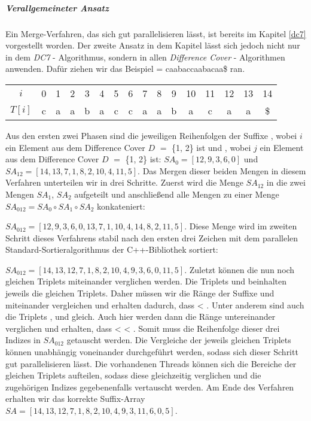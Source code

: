 \subparagraph*{Verallgemeineter Ansatz}

Ein Merge-Verfahren, das sich gut parallelisieren lässt, ist bereits im Kapitel \ref{dc7} vorgestellt worden. Der zweite Ansatz in dem Kapitel lässt sich jedoch nicht nur in dem \emph{DC7} - Algorithmus, sondern in allen \emph{Difference Cover} - Algorithmen anwenden.
Dafür ziehen wir das Beispiel  = caabaccaabacaa\$ ran.

\begin{table}[H]
	\centering
	\begin{tabular}{c| c c c c c c c c c c c c c c c}
		$i$ & 0 & 1 & 2 & 3 & 4 & 5 & 6 & 7 & 8 & 9 & 10 & 11 & 12 & 13 & 14 \\
		$T[i]$ & c & a & a & b & a & c & c & a & a & b & a & c & a & a & \$
	\end{tabular}
\end{table}

Aus den ersten zwei Phasen sind die jeweiligen Reihenfolgen der Suffixe , wobei $i$ ein Element aus dem Difference Cover \(D\) $=$ \{1, 2\} ist und , wobei $j$ ein Element aus dem Difference Cover \(D\) $=$ \{1, 2\} ist:
$SA_{0} = [12, 9, 3, 6, 0]$ und $SA_{12} = [14, 13, 7, 1, 8, 2, 10, 4, 11, 5]$.
Das Mergen dieser beiden Mengen in diesem Verfahren unterteilen wir in drei Schritte. Zuerst wird die Menge $SA_{12}$ in die zwei Mengen $SA_1$, $SA_2$ aufgeteilt und anschließend alle Mengen zu einer Menge $SA_{012} = SA_0 \circ SA_1 \circ SA_2$ konkateniert:

$SA_{012} = [12, 9, 3, 6, 0, 13, 7, 1, 10, 4, 14, 8, 2, 11, 5]$.
Diese Menge wird im zweiten Schritt dieses Verfahrens stabil nach den ersten drei Zeichen mit dem parallelen Standard-Sortieralgorithmus der C++-Bibliothek sortiert:

$SA_{012} = [14, 13, 12, 7, 1, 8, 2, 10, 4, 9, 3, 6, 0, 11, 5]$. Zuletzt können die nun noch gleichen Triplets miteinander verglichen werden. Die Triplets  und  beinhalten jeweils die gleichen Triplets. Daher müssen wir die Ränge der Suffixe  und  miteinander vergleichen und erhalten dadurch, dass  < . Unter anderem sind auch die Triplets ,  und  gleich. Auch hier werden dann die Ränge untereinander verglichen und erhalten, dass  <  < . Somit muss die Reihenfolge dieser drei Indizes in $SA_{012}$ getauscht werden. Die Vergleiche der jeweils gleichen Triplets können unabhängig voneinander durchgeführt werden, sodass sich dieser Schritt gut parallelisieren lässt. Die vorhandenen Threads können sich die Bereiche der gleichen Triplets aufteilen, sodass diese gleichzeitig verglichen und die zugehörigen Indizes gegebenenfalls vertauscht werden. Am Ende des Verfahren erhalten wir das korrekte Suffix-Array $SA = [14, 13, 12, 7, 1, 8, 2, 10, 4, 9, 3, 11, 6, 0, 5]$.